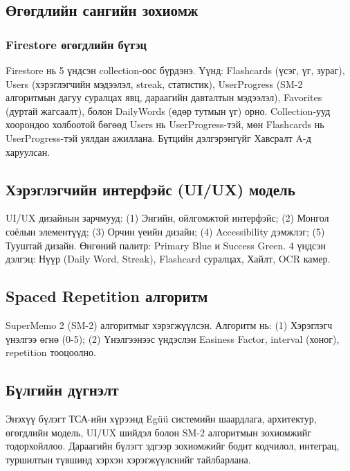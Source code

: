 \subsection{Өгөгдлийн сангийн зохиомж}
\label{subsec:database-design}

\subsubsection{Firestore өгөгдлийн бүтэц}

Firestore нь 5 үндсэн collection-оос бүрдэнэ. Үүнд: Flashcards (үсэг, үг, зураг), Users (хэрэглэгчийн мэдээлэл, streak, статистик), UserProgress (SM-2 алгоритмын дагуу суралцах явц, дараагийн давталтын мэдээлэл), Favorites (дуртай жагсаалт), болон DailyWords (өдөр тутмын үг) орно. Collection-ууд хоорондоо холбоотой бөгөөд Users нь UserProgress-тэй, мөн Flashcards нь UserProgress-тэй уялдан ажиллана. Бүтцийн дэлгэрэнгүйг Хавсралт A-д харуулсан.

\subsection{Хэрэглэгчийн интерфэйс (UI/UX) модель}
\label{subsec:ui-ux-design}

UI/UX дизайнын зарчмууд: (1) Энгийн, ойлгомжтой интерфэйс; (2) Монгол соёлын элементүүд; (3) Орчин үеийн дизайн; (4) Accessibility дэмжлэг; (5) Тууштай дизайн. Өнгөний палитр: Primary Blue и Success Green. 4 үндсэн дэлгэц: Нүүр (Daily Word, Streak), Flashcard суралцах, Хайлт, OCR камер.

\subsection{Spaced Repetition алгоритм}
\label{subsec:spaced-repetition-implementation}

SuperMemo 2 (SM-2) алгоритмыг хэрэгжүүлсэн. Алгоритм нь: (1) Хэрэглэгч үнэлгээ өгнө (0-5); (2) Үнэлгээнээс үндэслэн Easiness Factor, interval (хоног), repetition тооцоолно.

\subsection{Бүлгийн дүгнэлт}

Энэхүү бүлэгт ТСА-ийн хүрээнд Egüü системийн шаардлага, архитектур, өгөгдлийн модель, UI/UX шийдэл болон SM-2 алгоритмын зохиомжийг тодорхойллоо. Дараагийн бүлэгт эдгээр зохиомжийг бодит кодчилол, интеграц, туршилтын түвшинд хэрхэн хэрэгжүүлснийг тайлбарлана.

\vfill
